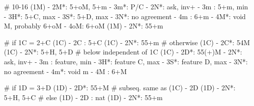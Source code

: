 # 10-16
(1M) - 2M*: 5+oM, 5+m
          - 3m*: P/C
          - 2N*: ask, inv+
               - 3m : 5+m, min
               - 3H*: 5+C, max
               - 3S*: 5+D, max
               - 3N*: no agreement
               - 4m : 6+m
               - 4M*: void M, probably 6+oM
               - 4oM: 6+oM
(1M) - 2N*: 55+m

# if 1C = 2+C
(1C) - 2C : 5+C
(1C) - 2N*: 55+m
# otherwise
(1C) - 2C*: 54M
(1C) - 2N*: 5+H, 5+D
# below independent of 1C
(1C) - 2D*: 55(+)M 
          - 2N*: ask, inv+
               - 3m : feature, min
               - 3H*: feature C, max
               - 3S*: feature D, max
               - 3N*: no agreement
               - 4m*: void m
               - 4M : 6+M

# if 1D = 3+D
(1D) - 2D*: 55+M  # subseq. same as (1C) - 2D
(1D) - 2N*: 5+H, 5+C
# else
(1D) - 2D : nat 
(1D) - 2N*: 55+m
